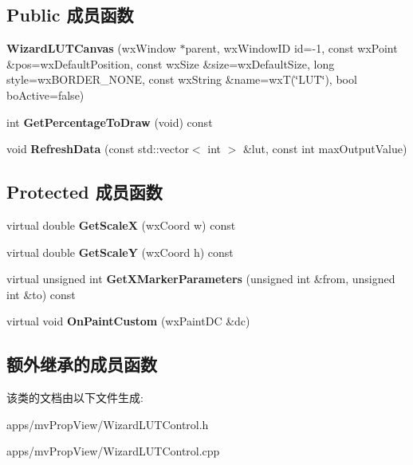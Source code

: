 \subsection*{Public 成员函数}
\begin{DoxyCompactItemize}
\item 
\hypertarget{class_wizard_l_u_t_canvas_a3daf4a287bef8b61d029c6038b370575}{{\bfseries Wizard\+L\+U\+T\+Canvas} (wx\+Window $\ast$parent, wx\+Window\+I\+D id=-\/1, const wx\+Point \&pos=wx\+Default\+Position, const wx\+Size \&size=wx\+Default\+Size, long style=wx\+B\+O\+R\+D\+E\+R\+\_\+\+N\+O\+N\+E, const wx\+String \&name=wx\+T(\char`\"{}L\+U\+T\char`\"{}), bool bo\+Active=false)}\label{class_wizard_l_u_t_canvas_a3daf4a287bef8b61d029c6038b370575}

\item 
\hypertarget{class_wizard_l_u_t_canvas_a5bfe9d5e5ad35e67c80320e479d4d73d}{int {\bfseries Get\+Percentage\+To\+Draw} (void) const }\label{class_wizard_l_u_t_canvas_a5bfe9d5e5ad35e67c80320e479d4d73d}

\item 
\hypertarget{class_wizard_l_u_t_canvas_a3fb41dfc8f713c1efad67c0efb1ffef6}{void {\bfseries Refresh\+Data} (const std\+::vector$<$ int $>$ \&lut, const int max\+Output\+Value)}\label{class_wizard_l_u_t_canvas_a3fb41dfc8f713c1efad67c0efb1ffef6}

\end{DoxyCompactItemize}
\subsection*{Protected 成员函数}
\begin{DoxyCompactItemize}
\item 
\hypertarget{class_wizard_l_u_t_canvas_acf04051a633d4b54f9b66b47fa6da0a1}{virtual double {\bfseries Get\+Scale\+X} (wx\+Coord w) const }\label{class_wizard_l_u_t_canvas_acf04051a633d4b54f9b66b47fa6da0a1}

\item 
\hypertarget{class_wizard_l_u_t_canvas_a67659aaa0037e3e58d30eb096021cced}{virtual double {\bfseries Get\+Scale\+Y} (wx\+Coord h) const }\label{class_wizard_l_u_t_canvas_a67659aaa0037e3e58d30eb096021cced}

\item 
\hypertarget{class_wizard_l_u_t_canvas_a7904dd13ee9d033cbf2b95574fb473ab}{virtual unsigned int {\bfseries Get\+X\+Marker\+Parameters} (unsigned int \&from, unsigned int \&to) const }\label{class_wizard_l_u_t_canvas_a7904dd13ee9d033cbf2b95574fb473ab}

\item 
\hypertarget{class_wizard_l_u_t_canvas_a24ec9a40c3eb68da448a70eb0a691029}{virtual void {\bfseries On\+Paint\+Custom} (wx\+Paint\+D\+C \&dc)}\label{class_wizard_l_u_t_canvas_a24ec9a40c3eb68da448a70eb0a691029}

\end{DoxyCompactItemize}
\subsection*{额外继承的成员函数}


该类的文档由以下文件生成\+:\begin{DoxyCompactItemize}
\item 
apps/mv\+Prop\+View/Wizard\+L\+U\+T\+Control.\+h\item 
apps/mv\+Prop\+View/Wizard\+L\+U\+T\+Control.\+cpp\end{DoxyCompactItemize}
